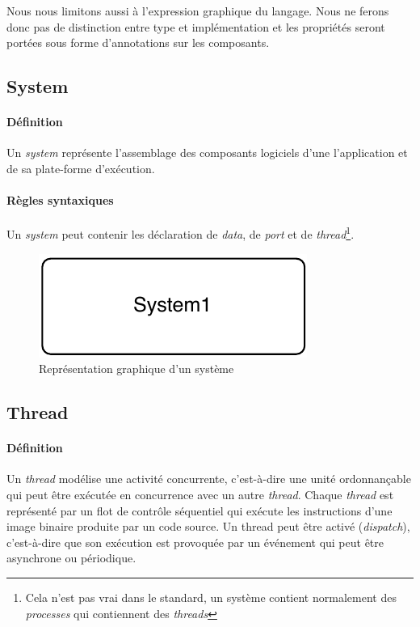 \documentclass[11pt,a4paper]{paper}
\begin{document}
\begin{appendices}
{\begin{minipage}{0.9\textwidth}
Nous nous limitons aussi à l'expression graphique du langage. Nous ne ferons donc pas de distinction entre type et implémentation et les propriétés seront portées sous forme d'annotations sur les composants.
\end{minipage}
}

\subsection{System}
\paragraph{Définition} Un {\em system} représente l'assemblage des composants logiciels d'une l'application et de sa plate-forme d'exécution.

\paragraph{Règles syntaxiques} Un {\em system} peut contenir les déclaration de {\em data}, de {\em port} et de {\em thread}\footnote{Cela n'est pas vrai dans le standard, un système contient normalement des {\em processes} qui contiennent des {\em threads}}.


\begin{figure}[h]
\begin{center}
\includegraphics[scale=.6]{figures_pdf/system.pdf}
\caption{Représentation graphique d'un système}
\end{center}
\end{figure}
\FloatBarrier


\newpage
\subsection{Thread}

\paragraph{Définition} Un {\em thread} modélise une activité concurrente, c'est-à-dire une unité ordonnançable qui peut être exécutée en concurrence avec un autre {\em thread}. Chaque {\em thread} est représenté par un flot de contrôle séquentiel qui exécute les instructions d'une image binaire produite par un code source. Un thread peut être activé ({\em dispatch}), c'est-à-dire que son exécution est provoquée par un événement qui peut être asynchrone ou périodique.


\end{appendices}
\end{document}
